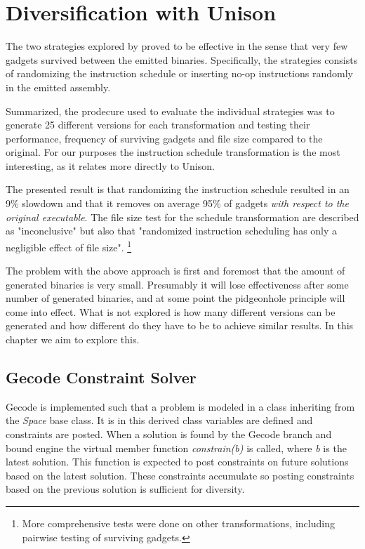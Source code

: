 \chapter{Diversification with Unison}

The two strategies explored by \textcite{large-scale-automated} proved to be effective in
the sense that very few gadgets survived between the emitted binaries. Specifically, the
strategies consists of randomizing the instruction schedule or inserting no-op instructions
randomly in the emitted assembly.

Summarized, the prodecure \textcite{large-scale-automated} used to evaluate the individual
strategies was to generate 25 different versions for each transformation and testing their
performance, frequency of surviving gadgets and file size compared to the original. For
our purposes the instruction schedule transformation is the most interesting, as it relates
more directly to Unison.

The presented result is that randomizing the instruction schedule resulted in an 9\%
slowdown and that it removes on average 95\% of gadgets \textit{with respect to the original executable}.
The file size test for the schedule transformation are described as "inconclusive" but
also that "randomized instruction scheduling has only a negligible effect of file size".
\footnote{More comprehensive tests were done on other transformations, including pairwise
testing of surviving gadgets.}

The problem with the above approach is first and foremost that the amount of generated
binaries is very small. Presumably it will lose effectiveness after some number of
generated binaries, and at some point the pidgeonhole principle will come into effect.
What is not explored is how many different versions can be generated and how different do
they have to be to achieve similar results. In this chapter we aim to explore this.

\section{Gecode Constraint Solver}

Gecode is implemented such that a problem is modeled in a class inheriting from the
\textit{Space} base class. It is in this derived class variables are defined and constraints
are posted. When a solution is found by the Gecode branch and bound engine the virtual
member function \textit{constrain(b)} is called, where \textit{b} is the latest solution.
This function is expected to post constraints on future solutions based on the latest
solution. These constraints accumulate so posting constraints based on the previous solution
is sufficient for diversity.

